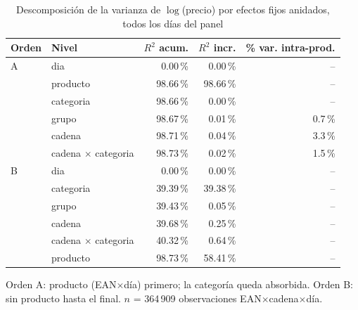 \begin{table}[htbp]
\caption{Descomposici\'on de la varianza de $\log$(precio) por efectos fijos anidados, todos los d\'ias del panel}
\label{tab:varianza}
\centering\scriptsize\setlength{\tabcolsep}{3pt}
\begin{tabular}{@{}llrrr@{}}
\toprule
Orden & Nivel & $R^2$ acum. & $R^2$ incr. & \% var. intra-prod. \\
\midrule
A & dia & 0.00\,\% & 0.00\,\% & -- \\
 & producto & 98.66\,\% & 98.66\,\% & -- \\
 & categoria & 98.66\,\% & 0.00\,\% & -- \\
 & grupo & 98.67\,\% & 0.01\,\% & 0.7\,\% \\
 & cadena & 98.71\,\% & 0.04\,\% & 3.3\,\% \\
 & cadena $\times$ categoria & 98.73\,\% & 0.02\,\% & 1.5\,\% \\
\midrule
B & dia & 0.00\,\% & 0.00\,\% & -- \\
 & categoria & 39.39\,\% & 39.38\,\% & -- \\
 & grupo & 39.43\,\% & 0.05\,\% & -- \\
 & cadena & 39.68\,\% & 0.25\,\% & -- \\
 & cadena $\times$ categoria & 40.32\,\% & 0.64\,\% & -- \\
 & producto & 98.73\,\% & 58.41\,\% & -- \\
\bottomrule\end{tabular}
\par\smallskip\raggedright\scriptsize Orden A: producto (EAN$\times$d\'ia) primero; la categor\'ia queda absorbida. Orden B: sin producto hasta el final. $n$ = 364\,909 observaciones EAN$\times$cadena$\times$d\'ia.
\end{table}
